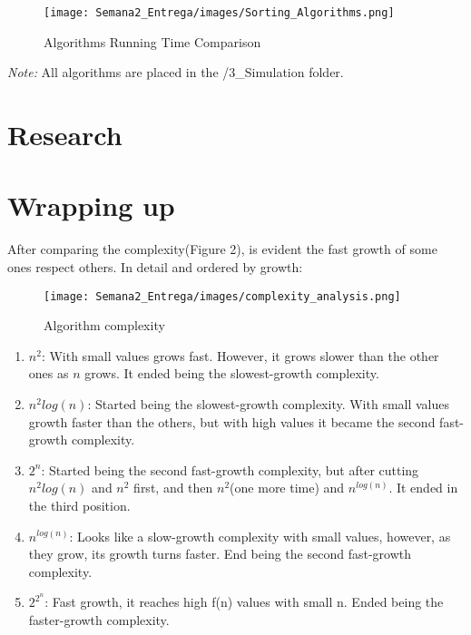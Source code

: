 \documentclass[12pt]{article}
\begin{document}
\begin{itemize}
    \begin{figure}[htbp]
        \centering
        \texttt{[image: Semana2\_Entrega/images/Sorting\_Algorithms.png]}
        \caption{Algorithms Running Time Comparison}
        \label{fig:my_label}
    \end{figure}
\end{itemize}

\emph{Note:} All algorithms are placed in the /3\_Simulation folder.

\section{Research}


\section{Wrapping up}

After comparing the complexity(Figure 2), is evident the fast growth of some ones respect others. In detail and ordered by growth:

\begin{figure}[!htbp]
    \centering
    \texttt{[image: Semana2\_Entrega/images/complexity\_analysis.png]}
    \caption{Algorithm complexity}
    \label{fig:my_label}
\end{figure}


\begin{enumerate}
    \item $n^{2}$: With small values grows fast. However, it grows slower than the other ones as $n$ grows. It ended being the slowest-growth complexity.
    \item $n^{2}log(n)$: Started being the slowest-growth complexity. With small values growth faster than the others, but with high values it became the second fast-growth complexity.
    \item $2^{n}$: Started being the second fast-growth complexity, but after cutting $n^{2}log(n)$ and $n^{2}$ first, and then $n^{2}$(one more time) and $n^{log(n)}$. It ended in the third position. 
    \item $n^{log(n)}$: Looks like a slow-growth complexity with small values, however, as they grow, its growth turns faster. End being the second fast-growth complexity.
    \item $2^{2^{n}}$: Fast growth, it reaches high f(n) values with small n. Ended being the faster-growth complexity.
     
\end{enumerate}
\end{document}
